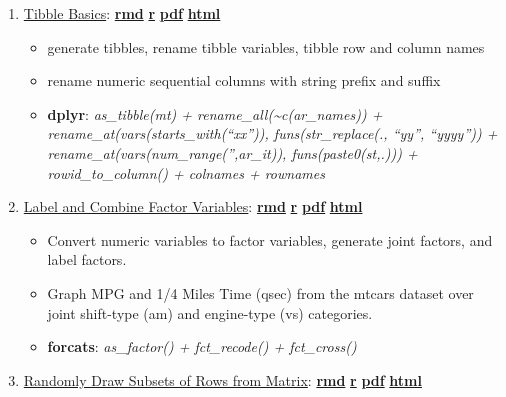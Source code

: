\documentclass[
]{book}
\providecommand{\tightlist}{%
  \setlength{\itemsep}{0pt}\setlength{\parskip}{0pt}}
\begin{document}
\begin{enumerate}
\def\labelenumi{\arabic{enumi}.}
\tightlist
\item
  \href{https://fanwangecon.github.io/R4Econ/amto/tibble/htmlpdfr/fs_tib_basics.html}{Tibble Basics}: \href{https://github.com/FanWangEcon/R4Econ/blob/master/amto/tibble//fs_tib_basics.Rmd}{\textbf{rmd}} \textbar{} \href{https://github.com/FanWangEcon/R4Econ/blob/master/amto/tibble/htmlpdfr/fs_tib_basics.R}{\textbf{r}} \textbar{} \href{https://github.com/FanWangEcon/R4Econ/blob/master/amto/tibble/htmlpdfr/fs_tib_basics.pdf}{\textbf{pdf}} \textbar{} \href{https://fanwangecon.github.io/R4Econ/amto/tibble/htmlpdfr/fs_tib_basics.html}{\textbf{html}}

  \begin{itemize}
  \tightlist
  \item
    generate tibbles, rename tibble variables, tibble row and column names
  \item
    rename numeric sequential columns with string prefix and suffix
  \item
    \textbf{dplyr}: \emph{as\_tibble(mt) + rename\_all(\textasciitilde c(ar\_names)) + rename\_at(vars(starts\_with(``xx'')), funs(str\_replace(., ``yy'', ``yyyy'')) + rename\_at(vars(num\_range('',ar\_it)), funs(paste0(st,.))) + rowid\_to\_column() + colnames + rownames}
  \end{itemize}
\item
  \href{https://fanwangecon.github.io/R4Econ/amto/tibble/htmlpdfr/fs_tib_factors.html}{Label and Combine Factor Variables}: \href{https://github.com/FanWangEcon/R4Econ/blob/master/amto/tibble//fs_tib_factors.Rmd}{\textbf{rmd}} \textbar{} \href{https://github.com/FanWangEcon/R4Econ/blob/master/amto/tibble/htmlpdfr/fs_tib_factors.R}{\textbf{r}} \textbar{} \href{https://github.com/FanWangEcon/R4Econ/blob/master/amto/tibble/htmlpdfr/fs_tib_factors.pdf}{\textbf{pdf}} \textbar{} \href{https://fanwangecon.github.io/R4Econ/amto/tibble/htmlpdfr/fs_tib_factors.html}{\textbf{html}}

  \begin{itemize}
  \tightlist
  \item
    Convert numeric variables to factor variables, generate joint factors, and label factors.
  \item
    Graph MPG and 1/4 Miles Time (qsec) from the mtcars dataset over joint shift-type (am) and engine-type (vs) categories.
  \item
    \textbf{forcats}: \emph{as\_factor() + fct\_recode() + fct\_cross()}
  \end{itemize}
\item
  \href{https://fanwangecon.github.io/R4Econ/amto/tibble/htmlpdfr/fs_tib_random_draws.html}{Randomly Draw Subsets of Rows from Matrix}: \href{https://github.com/FanWangEcon/R4Econ/blob/master/amto/tibble//fs_tib_random_draws.Rmd}{\textbf{rmd}} \textbar{} \href{https://github.com/FanWangEcon/R4Econ/blob/master/amto/tibble/htmlpdfr/fs_tib_random_draws.R}{\textbf{r}} \textbar{} \href{https://github.com/FanWangEcon/R4Econ/blob/master/amto/tibble/htmlpdfr/fs_tib_random_draws.pdf}{\textbf{pdf}} \textbar{} \href{https://fanwangecon.github.io/R4Econ/amto/tibble/htmlpdfr/fs_tib_random_draws.html}{\textbf{html}}


\end{enumerate}
\end{document}
